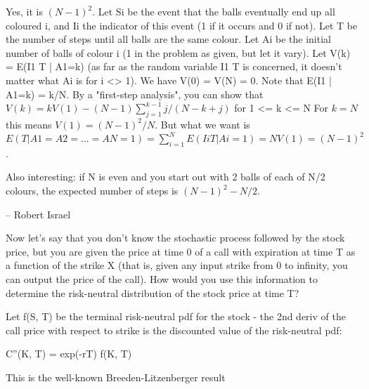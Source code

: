{Yes, it is $(N-1)^2$.  
Let Si be the event that the balls eventually end up all coloured i, and
Ii the indicator of this event (1 if it occurs and 0 if not).
Let T be the number of steps until all balls are the same colour.
Let Ai be the initial number of balls of colour i (1 in the problem as 
given,
but let it vary).
Let V(k) = E(I1 T | A1=k) (as far as the random variable I1 T is 
concerned, 
it doesn't matter what Ai is for i <> 1).  We have V(0) = V(N) = 0.
Note that E(I1 | A1=k) = k/N.
By a "first-step analysis", you can show that
    $V(k) = k V(1) - (N-1) \sum_{j=1}^{k-1} j/(N-k+j)$ for 1 <= k <= N
For $k=N$ this means $V(1) = (N-1)^2/N$.
But what we want is
    $E(T | A1=A2=...=AN=1) = \sum_{i=1}^N E(Ii T | Ai=1) = N V(1) = (N-1)^2$.

Also interesting: if N is even and you start out with 2 balls of each of 
N/2
colours, the expected number of steps is $(N-1)^2 - N/2$.

-- 
Robert Israel}




Now let's say that you don't know the stochastic process followed by the stock price, but you are given the price at time 0 of a call with expiration at time T as a function of the strike X (that is, given any input strike from 0 to infinity, you can output the price of the call). How would you use this information to determine the risk-neutral distribution of the stock price at time T?\par
Let f(S, T) be the terminal risk-neutral pdf for the stock - the 2nd deriv of the call price with respect to strike is the discounted value of the risk-neutral pdf:\par
C''(K, T) = exp(-rT) f(K, T)\par
This is the well-known Breeden-Litzenberger result\par








